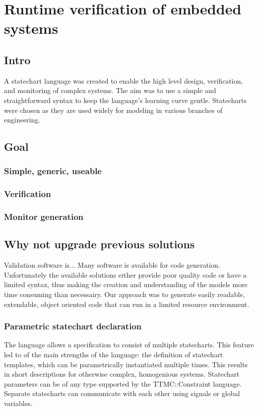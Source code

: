 \chapter{Runtime verification of embedded systems}
\label{chap:runtime_verification}

\section{Intro}
A statechart language was created to enable the high level design, verification, and monitoring of complex systems. The aim was to use a simple and straightforward syntax to keep the language’s learning curve gentle. Statecharts were chosen as they are used widely for modeling in various branches of engineering.
\section{Goal}
  \subsection{Simple, generic, useable}
  \subsection{Verification}
  \subsection{Monitor generation}
\section{Why not upgrade previous solutions}
Validation software is... 
Many software is available for code generation. Unfortunately the available solutions either provide poor quality code or have a limited syntax, thus making the creation and understanding of the models more time consuming than necessairy. Our approach was to generate easily readable, extendable, object oriented code that can run in a limited resource environment.
  \subsection{Parametric statechart declaration}
The language allows a specification to consist of multiple statecharts. This feature led to of the main strengths of the language: the definition of statechart templates, which can be parametrically instantiated multiple times. This results in short descriptions for otherwise complex, homogenious systems. Statechart parameters can be of any type supported by the TTMC::Constraint language. Separate statecharts can communicate with each other using signals or global variables.
